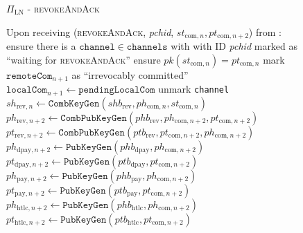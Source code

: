 \begin{figure}[!htbp]
  \begin{protocolbox}{$\Pi_{\mathrm{LN}}$ - \textsc{revokeAndAck}}
    \begin{algorithmic}[1]
      \State Upon receiving (\textsc{revokeAndAck}, \textit{pchid},
      $st_{\mathrm{com}, n}, pt_{\mathrm{com}, n+2}$) from \bob:
      \Indent
        \State ensure there is a $\mathtt{channel} \in \mathtt{channels}$ with
        \bob{} with ID \textit{pchid} marked as ``waiting for
        \textsc{revokeAndAck}''
        \State ensure $pk\left(st_{\mathrm{com}, n}\right) = pt_{\mathrm{com},
        n}$
        \State mark $\mathtt{remoteCom}_{n+1}$ as ``irrevocably committed''
        \State $\mathtt{localCom}_{n+1} \gets \mathtt{pendingLocalCom}$
        \State unmark \texttt{channel}
        \State $sh_{\mathrm{rev}, n} \gets
        \mathtt{CombKeyGen}\left(shb_{\mathrm{rev}}, ph_{\mathrm{com}, n},
        st_{\mathrm{com}, n}\right)$
        \State $ph_{\mathrm{rev}, n+2} \gets
        \mathtt{CombPubKeyGen}\left(phb_{\mathrm{rev}}, ph_{\mathrm{com}, n+2},
        pt_{\mathrm{com}, n+2}\right)$
        \State $pt_{\mathrm{rev}, n+2} \gets
        \mathtt{CombPubKeyGen}\left(ptb_{\mathrm{rev}}, pt_{\mathrm{com}, n+2},
        ph_{\mathrm{com}, n+2}\right)$
        \State $ph_{\mathrm{dpay}, n+2} \gets
        \texttt{PubKeyGen}\left(phb_{\mathrm{dpay}}, ph_{\mathrm{com},
        n+2}\right)$
        \State $pt_{\mathrm{dpay}, n+2} \gets
        \texttt{PubKeyGen}\left(ptb_{\mathrm{dpay}}, pt_{\mathrm{com},
        n+2}\right)$
        \State $ph_{\mathrm{pay}, n+2} \gets
        \texttt{PubKeyGen}\left(phb_{\mathrm{pay}}, ph_{\mathrm{com},
        n+2}\right)$
        \State $pt_{\mathrm{pay}, n+2} \gets
        \texttt{PubKeyGen}\left(ptb_{\mathrm{pay}}, pt_{\mathrm{com},
        n+2}\right)$
        \State $ph_{\mathrm{htlc}, n+2} \gets
        \texttt{PubKeyGen}\left(phb_{\mathrm{htlc}}, ph_{\mathrm{com},
        n+2}\right)$
        \State $pt_{\mathrm{htlc}, n+2} \gets
        \texttt{PubKeyGen}\left(ptb_{\mathrm{htlc}}, pt_{\mathrm{com},
        n+2}\right)$
      \EndIndent
    \end{algorithmic}
  \end{protocolbox}
  \caption{}
  \label{alg:protocol:pay:revokeAndAck}
\end{figure}

